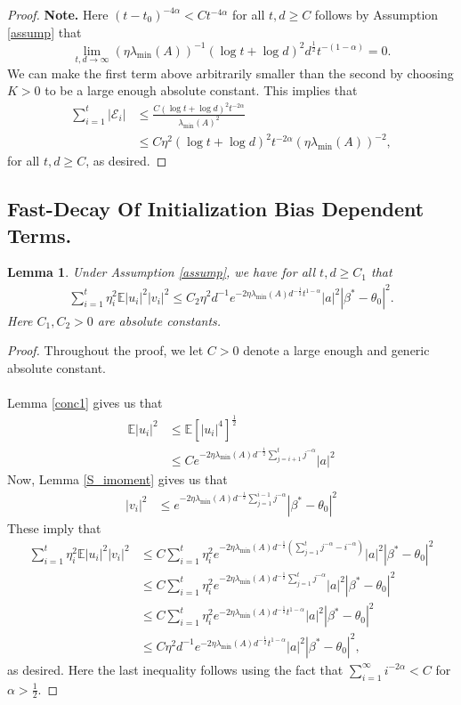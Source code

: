 \documentclass[11pt, reqno,english]{amsart}
\newtheorem{lemma}{Lemma}[section]
\begin{document}
\begin{proof}
\textbf{Note.} Here $(t - t_0)^{-4\alpha} < C t^{-4\alpha}$ for all $t,d \geq C$ follows by Assumption \ref{assump} that $$\lim\limits_{t,d \to \infty}(\eta \lambda_{\min}(A))^{-1}(\log t + \log d)^2 d^{\frac{1}{2}}t^{-(1 - \alpha)} = 0.$$ 
We can make the first term above arbitrarily smaller than the second by choosing $K > 0$ to be a large enough absolute constant. This implies that
\begin{align*}
    \sum_{i = 1}^t |\mathcal E_i| &\leq \frac{C(\log t + \log d)^2 t^{-2\alpha}}{\lambda_{\min}(A)^2}
    \\
    &\leq C\eta^2(\log t + \log d)^2 t^{-2\alpha} (\eta\lambda_{\min}(A))^{-2},
\end{align*}
for all $t,d \geq C$, as desired.
\end{proof}
\subsection{Fast-Decay Of Initialization Bias Dependent Terms.}
\begin{lemma}\label{variance-exp-term}
Under Assumption \ref{assump}, we have for all $t, d \geq C_1$ that
\begin{align*}
\sum_{i = 1}^t \eta_i^2 \mathbb{E}|u_i|^2|v_i|^2 \leq C_2 \eta^2 d^{-1}e^{-2\eta \lambda_{\min}(A) d^{-\frac{1}{2}}t^{1-\alpha}}|a|^2|\beta^* - \theta_0|^2.
\end{align*}
Here $C_1, C_2 > 0$ are absolute constants. 
\end{lemma}
\begin{proof}
Throughout the proof, we let $C > 0$ denote a large enough and generic absolute constant.
\\\\
Lemma \ref{conc1} gives us that 
\begin{align*}
\mathbb{E}|u_i|^2 &\leq \mathbb{E}[|u_i|^4]^{\frac{1}{2}} 
\\
&\leq Ce^{-2\eta \lambda_{\min}(A)d^{-\frac{1}{2}}\sum_{j = i+1}^t j^{-\alpha}}|a|^2
\end{align*}
Now, Lemma \ref{S_imoment} gives us that
\begin{align*}
|v_i|^2
&\leq e^{-2\eta\lambda_{\min}(A) d^{-\frac{1}{2}}\sum_{j = 1}^{i-1}j^{-\alpha}}|\beta^* - \theta_0|^2
\end{align*}
These imply that
\begin{align*}
\sum_{i = 1}^t \eta_i^2 \mathbb{E}|u_i|^2 |v_i|^2 &\leq C\sum_{i = 1}^t \eta_i^2 e^{-2\eta \lambda_{\min}(A) d^{-\frac{1}{2}}(\sum_{j = 1}^t j^{-\alpha} - i^{-\alpha})} |a|^2 |\beta^* - \theta_0|^2
\\
&\leq C\sum_{i = 1}^t \eta_i^2 e^{-2\eta \lambda_{\min}(A) d^{-\frac{1}{2}}\sum_{j = 1}^t j^{-\alpha}}|a|^2 |\beta^* - \theta_0|^2
\\
&\leq C\sum_{i = 1}^t \eta_i^2 e^{-2\eta \lambda_{\min}(A)d^{-\frac{1}{2}}t^{1 - \alpha}}|a|^2|\beta^* - \theta_0|^2
\\
&\leq C \eta^2 d^{-1}e^{-2\eta \lambda_{\min}(A) d^{-\frac{1}{2}}t^{1-\alpha}}|a|^2|\beta^* - \theta_0|^2,
\end{align*}
as desired. Here the last inequality follows using the fact that $\sum_{i = 1}^\infty i^{-2\alpha} < C$ for $\alpha > \frac{1}{2}$. 
\end{proof}
\end{document}
